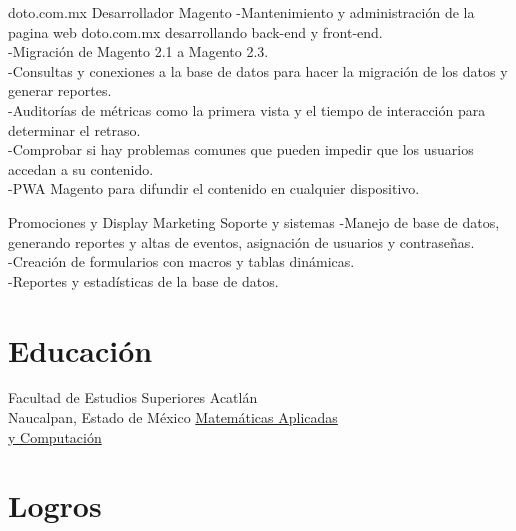 \documentclass[%
	       doublesided,
	       paper=a4,
	       fontsize=10pt
	      ]{my-resume}
\begin{document}
{    
	{doto.com.mx}
	{Desarrollador Magento}
	{
	    -Mantenimiento y administración de la pagina web doto.com.mx desarrollando back-end y front-end.\\
	    -Migración de Magento 2.1 a Magento 2.3.\\
	    -Consultas y conexiones a la base de datos para hacer la migración de los datos y generar reportes.\\ 
	    -Auditorías de métricas como la primera vista y el tiempo de interacción para determinar el retraso.\\ 
	    -Comprobar si hay problemas comunes que pueden impedir que los usuarios accedan a su contenido.\\
	    -PWA Magento para difundir el contenido en cualquier dispositivo.
	}
    
	{Promociones y Display Marketing}
	{Soporte y sistemas}
	{
	    -Manejo de base de datos, generando reportes y altas de eventos, asignación de usuarios y contraseñas.\\
	    -Creación de formularios con macros y tablas dinámicas.\\ 
	    -Reportes y estadísticas de la base de datos.
    }
    \section[\faMortarBoard]{Educación}
	{Facultad de Estudios Superiores Acatlán \\ Naucalpan, Estado de México}
	{\href{https://mac.acatlan.unam.mx/}{Matemáticas Aplicadas \\y Computación}}
	{}

}

\makebody
\clearpage


\pagestyle{highlightmain}
\highlightbar{}
\section{Logros}
\end{document}
